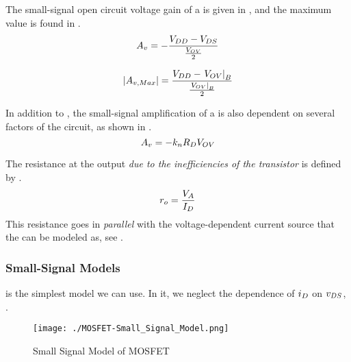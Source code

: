 The small-signal open circuit voltage gain of a  is given in , and the maximum value is found in .
\begin{equation}\label{eq:MOSFET-Small_Signal_Voltage_Gain}
  \Amp{\Voltage} = -\frac{\DCVoltage{DD} - \DCVoltage{DS}}{\frac{\OverdriveVoltage}{2}}
\end{equation}

\begin{equation}\label{eq:MOSFET-Small_Signal_Voltage_Gain-Max}
  \Abs{\Amp{\Voltage,Max}} = \frac{\DCVoltage{DD} - \left. \OverdriveVoltage \right\rvert_{\MaxBiasPoint}}{\frac{\left. \OverdriveVoltage \right\rvert_{\MaxBiasPoint}}{2}}
\end{equation}

In addition to , the small-signal amplification of a  is also dependent on several factors of the circuit, as shown in .
\begin{equation}\label{eq:MOSFET-Small_Signal_Voltage_Gain-Overdrive_Voltage}
  A_{v} = -k_{n} R_{D} V_{OV}
\end{equation}

The resistance at the output \emph{due to the inefficiencies of the transistor} is defined by .
\begin{equation}\label{eq:MOSFET-Transistor_Resistance}
  \ChannelModResist = \frac{\DCVoltage{A}}{\DCCurrent{\Drain}}
\end{equation}
This resistance goes in \emph{parallel} with the voltage-dependent current source that the  can be modeled as, see .

\subsubsection{Small-Signal Models}\label{subsubsec:MOSFET-Small_Signal_Models}
 is the simplest model we can use.
In it, we neglect the dependence of $\ACCurrent{\Drain}$ on $\ACVoltage{\Drain\Source}$, .

\begin{figure}[h!tbp]
  \centering
  \texttt{[image: ./MOSFET-Small\_Signal\_Model.png]}
  \caption{Small Signal Model of MOSFET \parencite[p.~387]{sedraTextbook7}}
  \label{fig:MOSFET-Small_Signal_Model}
\end{figure}


